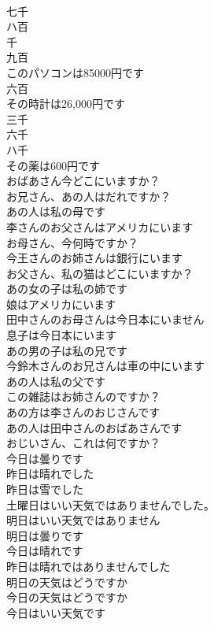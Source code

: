 \documentclass[8pt]{extreport}
\begin{document}
\begin{CJK}{UTF8}{min}
\\	七千	
\\	ハ百	
\\	千	
\\	九百	
\\	このパソコンは85000円です	
\\	六百	
\\	その時計は26,000円です	
\\	三千	
\\	六千	
\\	ハ千	
\\	その薬は600円です	
\\	おばあさん今どこにいますか？	
\\	お兄さん、あの人はだれですか？	
\\	あの人は私の母です	
\\	李さんのお父さんはアメリカにいます	
\\	お母さん、今何時ですか？	
\\	今王さんのお姉さんは銀行にいます	
\\	お父さん、私の猫はどこにいますか？	
\\	あの女の子は私の姉です	
\\	娘はアメリカにいます	
\\	田中さんのお母さんは今日本にいません	
\\	息子は今日本にいます	
\\	あの男の子は私の兄です	
\\	今鈴木さんのお兄さんは車の中にいます	
\\	あの人は私の父です	
\\	この雑誌はお姉さんのですか？	
\\	あの方は李さんのおじさんです	
\\	あの人は田中さんのおばあさんです	
\\	おじいさん、これは何ですか？	
\\	今日は曇りです	
\\	昨日は晴れでした	
\\	昨日は雪でした	
\\	土曜日はいい天気ではありませんでした。	
\\	明日はいい天気ではありません	
\\	明日は曇りです	
\\	今日は晴れです	
\\	昨日は晴れではありませんでした	
\\	明日の天気はどうですか	
\\	今日の天気はどうですか	
\\	今日はいい天気です	

\end{CJK}
\end{document}
